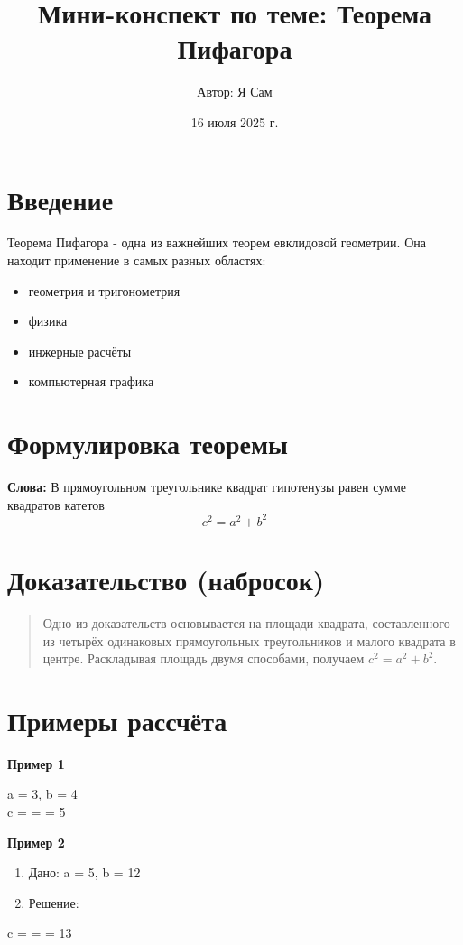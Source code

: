 \documentclass{article}
\title{Мини-конспект по теме: Теорема Пифагора}
\author{Автор: Я Сам}
\date{16 июля 2025 г.}
\begin{document}
\maketitle
\tableofcontents
\newpage
\section{Введение}
Теорема Пифагора - одна из важнейших теорем евклидовой геометрии. Она находит применение в самых разных областях:
\begin{itemize}
    \item геометрия и тригонометрия
    \item физика
    \item инжерные расчёты
    \item компьютерная графика
\end{itemize}

\section{Формулировка теоремы}
\textbf{Слова:} В прямоугольном треугольнике квадрат гипотенузы равен сумме квадратов катетов
\begin{equation}\label{eq:pythagoras}
    c^2=a^2+b^2
\end{equation}

\section{Доказательство (набросок)}
\begin{quote}
    Одно из доказательств основывается на площади квадрата, составленного из четырёх одинаковых прямоугольных треугольников и малого квадрата в центре. Раскладывая площадь двумя способами, получаем $c^2=a^2+b^2$.
\end{quote}

\section{Примеры рассчёта}
\textbf{Пример 1}
\begin{center}
    a = 3, b = 4 \\ c =  =  = 5
\end{center}
\textbf{Пример 2}
\begin{enumerate}
    \item Дано: a = 5, b = 12
    \item Решение:
\end{enumerate}
\begin{center}
    c =  =  = 13
\end{center}
\end{document}

